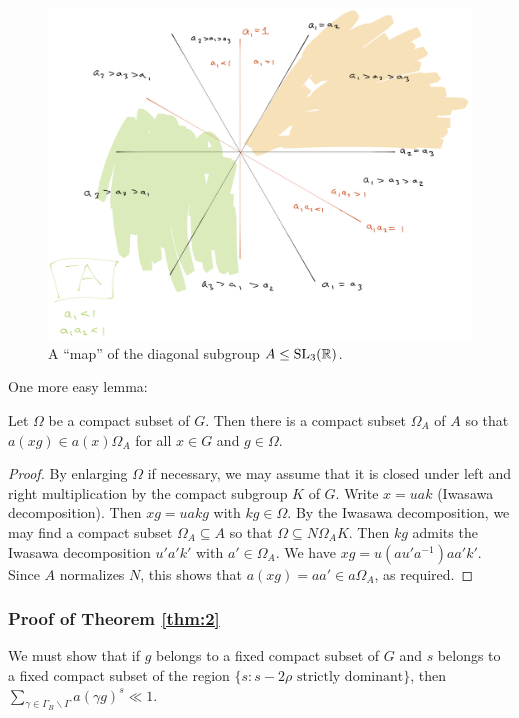 \documentclass[reqno]{amsart} 
\begin{document}
\begin{figure}
  \includegraphics[width=12.8 cm, height = 10 cm]{map-A-SL3.png}
  \caption{ A ``map'' of the diagonal subgroup $A \leq \operatorname{SL}_3(\mathbb{R})$.  }
\end{figure}


One more easy lemma:
\begin{lemma}\label{lem:stoes2021:let-omega-be}
  Let $\Omega$ be a compact subset of $G$.  Then there is a compact subset $\Omega _A$ of $A$ so that $a(x g) \in a(x) \Omega_A$ for all $x \in G$ and $g \in \Omega$.
\end{lemma}
\begin{proof}
  By enlarging $\Omega$ if necessary, we may assume that it is closed under left and right multiplication by the compact subgroup $K$ of $G$.  Write $x = u a k$ (Iwasawa decomposition).  Then $x g = u a k g$ with $k g \in \Omega$.  By the Iwasawa decomposition, we may find a compact subset $\Omega_A \subseteq A$ so that $\Omega \subseteq N \Omega_A K$.  Then $k g$ admits the Iwasawa decomposition $u' a' k'$ with $a' \in \Omega_A$.  We have $x g = u (a u' a^{-1}) a a' k'$.  Since $A$ normalizes $N$, this shows that $a(x g) = a a' \in a \Omega_A$, as required.
\end{proof}

\subsubsection{Proof of Theorem \ref{thm:2}}
We must show that if $g$ belongs to a fixed compact subset of $G$ and $s$ belongs to a fixed compact subset of the region $\{s : s - 2 \rho \text{ strictly dominant}\}$, then $\sum _{\gamma \in \Gamma_B \backslash \Gamma } a(\gamma g)^s \ll 1$.
\end{document}
